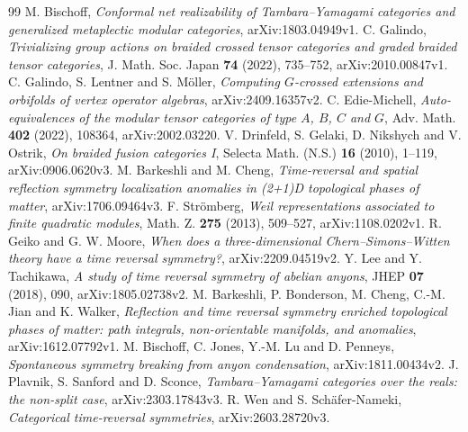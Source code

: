 \documentclass{amsart}
\theoremstyle{definition}\newtheorem{definition}[theorem]{Definition}
\theoremstyle{remark}\newtheorem{remark}[theorem]{Remark}
\begin{document}
\begin{thebibliography}{99}
 M. Bischoff, \emph{Conformal net realizability of
Tambara--Yamagami categories and generalized metaplectic modular categories},
arXiv:1803.04949v1.
 C. Galindo, \emph{Trivializing group actions on braided
crossed tensor categories and graded braided tensor categories},
J. Math. Soc. Japan \textbf{74} (2022), 735--752, arXiv:2010.00847v1.
 C. Galindo, S. Lentner and S. M\"oller,
\emph{Computing $G$-crossed extensions and orbifolds of vertex operator
algebras}, arXiv:2409.16357v2.
 C. Edie-Michell, \emph{Auto-equivalences of the modular
tensor categories of type $A$, $B$, $C$ and $G$}, Adv. Math. \textbf{402}
(2022), 108364, arXiv:2002.03220.
 V. Drinfeld, S. Gelaki, D. Nikshych and V. Ostrik,
\emph{On braided fusion categories I}, Selecta Math. (N.S.) \textbf{16}
(2010), 1--119, arXiv:0906.0620v3.
 M. Barkeshli and M. Cheng, \emph{Time-reversal and spatial
reflection symmetry localization anomalies in (2+1)D topological phases of matter},
arXiv:1706.09464v3.
 F. Str\"omberg, \emph{Weil representations associated
to finite quadratic modules}, Math. Z. \textbf{275} (2013), 509--527,
arXiv:1108.0202v1.
 R. Geiko and G. W. Moore,
\emph{When does a three-dimensional Chern--Simons--Witten theory have
a time reversal symmetry?}, arXiv:2209.04519v2.
 Y. Lee and Y. Tachikawa, \emph{A study of time reversal
symmetry of abelian anyons}, JHEP \textbf{07} (2018), 090,
arXiv:1805.02738v2.
 M. Barkeshli, P. Bonderson, M. Cheng, C.-M. Jian and
K. Walker, \emph{Reflection and time reversal symmetry enriched
topological phases of matter: path integrals, non-orientable manifolds,
and anomalies}, arXiv:1612.07792v1.
 M. Bischoff, C. Jones, Y.-M. Lu and D. Penneys,
\emph{Spontaneous symmetry breaking from anyon condensation},
arXiv:1811.00434v2.
 J. Plavnik, S. Sanford and D. Sconce,
\emph{Tambara--Yamagami categories over the reals: the non-split case},
arXiv:2303.17843v3.
 R. Wen and S. Sch\"afer-Nameki,
\emph{Categorical time-reversal symmetries}, arXiv:2603.28720v3.
\end{thebibliography}
\end{document}

